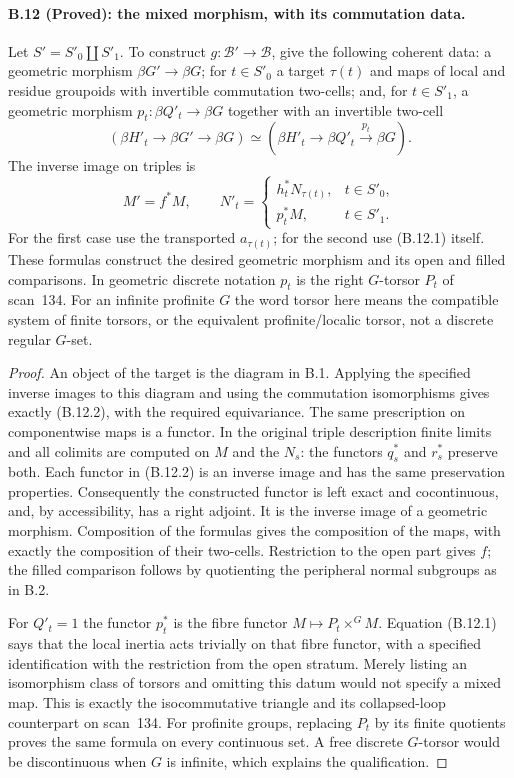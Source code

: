 \paragraph{B.12 (Proved): the mixed morphism, with its commutation data.}\label{B12}
Let $S'=S'_0\amalg S'_1$. To construct
$g:\mathcal B'\to\mathcal B$, give the following coherent
data: a geometric morphism $\beta G'\to\beta G$;
for $t\in S'_0$ a target $\tau(t)$ and maps of local and
residue groupoids with invertible commutation two-cells;
and, for $t\in S'_1$, a geometric morphism
$p_t:\beta Q'_t\to\beta G$ together with an invertible
two-cell
\[
 (\beta H'_t\to\beta G'\to\beta G)
       \simeq(\beta H'_t\to\beta Q'_t\xrightarrow{p_t}\beta G).
                                                               \tag{B.12.1}
\]
The inverse image on triples is
\[
 M'=f^*M,\qquad
 N'_t=\begin{cases}
        h_t^*N_{\tau(t)},&t\in S'_0,\\
        p_t^*M,&t\in S'_1.
       \end{cases}                                           \tag{B.12.2}
\]
For the first case use the transported $a_{\tau(t)}$;
for the second use (B.12.1) itself. These formulas
construct the desired geometric morphism and its open
and filled comparisons. In geometric discrete notation
$p_t$ is the right $G$-torsor $P_t$ of scan~134.
For an infinite profinite $G$ the word torsor here means
the compatible system of finite torsors, or the
equivalent profinite/localic torsor, not a discrete
regular $G$-set.

\begin{proof}
An object of the target is the diagram in B.1. Applying
the specified inverse images to this diagram and using
the commutation isomorphisms gives exactly (B.12.2), with
the required equivariance. The same prescription on
componentwise maps is a functor. In the original triple
description finite limits and all colimits are computed
on $M$ and the $N_s$: the functors $q_s^*$ and $r_s^*$
preserve both. Each functor in (B.12.2) is an inverse
image and has the same preservation properties.
Consequently the constructed functor is left exact and
cocontinuous, and, by accessibility, has a right adjoint.
It is the inverse image of a geometric morphism.
Composition of the formulas gives the composition of
the maps, with exactly the composition of their
two-cells. Restriction to the open part gives $f$;
the filled comparison follows by quotienting the
peripheral normal subgroups as in B.2.

For $Q'_t=1$ the functor $p_t^*$ is the fibre functor
$M\mapsto P_t\times^G M$. Equation (B.12.1) says that
the local inertia acts trivially on that fibre functor,
with a specified identification with the restriction
from the open stratum. Merely listing an isomorphism
class of torsors and omitting this datum would not
specify a mixed map. This is exactly the isocommutative
triangle and its collapsed-loop counterpart on scan~134.
For profinite groups, replacing $P_t$ by its finite
quotients proves the same formula on every continuous
set. A free discrete $G$-torsor would be discontinuous
when $G$ is infinite, which explains the qualification.
\end{proof}

